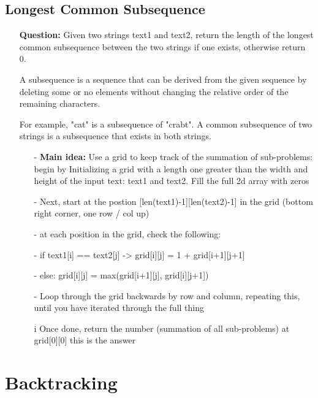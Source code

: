 \documentclass[12pt]{article}
\begin{document}
\subsection{Longest Common Subsequence}
\begin{enumerate}
  \item[] \textbf{Question:} Given two strings text1 and text2, return the length of the longest common subsequence between the two strings if one exists, otherwise return 0.

A subsequence is a sequence that can be derived from the given sequence by deleting some or no elements without changing the relative order of the remaining characters.

For example, "cat" is a subsequence of "crabt".
A common subsequence of two strings is a subsequence that exists in both strings.

    \begin{enumerate}
      \item[-] \textbf{Main idea:} Use a grid to keep track of the summation of sub-problems: begin by Initializing a grid with a length one greater than the width and height of the input text: text1 and text2. Fill the full 2d array with zeros
      \item[-] Next, start at the postion [len(text1)-1][len(text2)-1] in the grid (bottom right corner, one row / col up)
      \item[-] at each position in the grid, check the following:
      \item[-] if text1[i] == text2[j] -> grid[i][j] = 1 + grid[i+1][j+1] 
      \item[-] else: grid[i][j] = max(grid[i+1][j], grid[i][j+1])
      \item[-] Loop through the grid backwards by row and column, repeating this, until you have iterated through the full thing
      \item[i] Once done, return the number (summation of all sub-problems) at grid[0][0] this is the answer
    \end{enumerate}
\end{enumerate}



\section{Backtracking}
\end{document}
